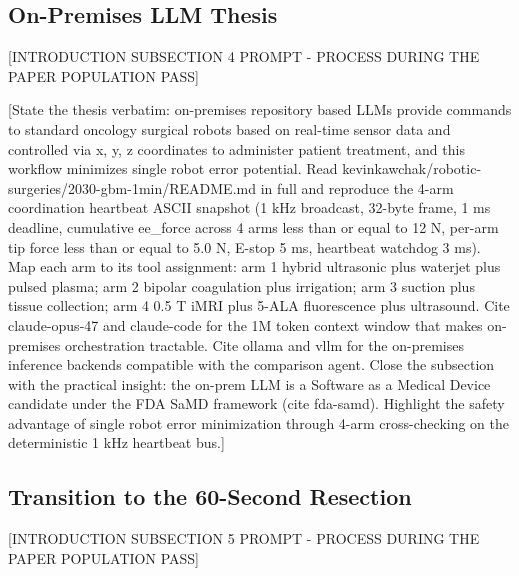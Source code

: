 \subsection{On-Premises LLM Thesis}
\label{sec:intro-thesis}

[INTRODUCTION SUBSECTION 4 PROMPT - PROCESS DURING THE PAPER POPULATION PASS]

[State the thesis verbatim: on-premises repository based LLMs provide
commands to standard oncology surgical robots based on real-time
sensor data and controlled via x, y, z coordinates to administer
patient treatment, and this workflow minimizes single robot error
potential. Read kevinkawchak/robotic-surgeries/2030-gbm-1min/README.md
in full and reproduce the 4-arm coordination heartbeat ASCII snapshot
(1 kHz broadcast, 32-byte frame, 1 ms deadline, cumulative ee_force
across 4 arms less than or equal to 12 N, per-arm tip force less than
or equal to 5.0 N, E-stop 5 ms, heartbeat watchdog 3 ms). Map each
arm to its tool assignment: arm 1 hybrid ultrasonic plus waterjet
plus pulsed plasma; arm 2 bipolar coagulation plus irrigation; arm 3
suction plus tissue collection; arm 4 0.5 T iMRI plus 5-ALA
fluorescence plus ultrasound. Cite claude-opus-47 and claude-code for
the 1M token context window that makes on-premises orchestration
tractable. Cite ollama and vllm for the on-premises inference
backends compatible with the comparison agent. Close the subsection
with the practical insight: the on-prem LLM is a Software as a
Medical Device candidate under the FDA SaMD framework (cite fda-samd).
Highlight the safety advantage of single robot error minimization
through 4-arm cross-checking on the deterministic 1 kHz heartbeat
bus.]

\subsection{Transition to the 60-Second Resection}
\label{sec:intro-transition}

[INTRODUCTION SUBSECTION 5 PROMPT - PROCESS DURING THE PAPER POPULATION PASS]

